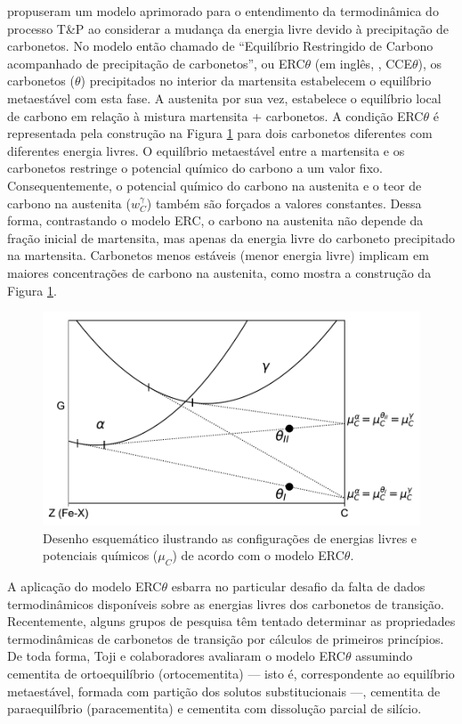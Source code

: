  propuseram um modelo aprimorado para o entendimento da termodinâmica do processo T\&P ao considerar a mudança da energia livre devido à precipitação de carbonetos. No modelo então chamado de ``Equilíbrio Restringido de Carbono acompanhado de precipitação de carbonetos'', ou ERC$\theta$ (em inglês, , CCE$\theta$), os carbonetos ($\theta$) precipitados no interior da martensita estabelecem o equilíbrio metaestável com esta fase. A austenita por sua vez, estabelece o equilíbrio local de carbono em relação à mistura martensita + carbonetos. A condição ERC$\theta$ é representada pela construção na Figura \ref{fig:esquema_ERCtheta} para dois carbonetos diferentes com diferentes energia livres. O equilíbrio metaestável entre a martensita e os carbonetos restringe o potencial químico do carbono a um valor fixo. Consequentemente, o potencial químico do carbono na austenita e o teor de carbono na austenita ($w_C^\gamma$) também são forçados a valores constantes. Dessa forma, contrastando o modelo ERC, o carbono na austenita não depende da fração inicial de martensita, mas apenas da energia livre do carboneto precipitado na martensita. Carbonetos menos estáveis (menor energia livre) implicam em maiores concentrações de carbono na austenita, como mostra a construção da Figura \ref{fig:esquema_ERCtheta}. 

\begin{figure}
  \centering  
  \includegraphics[width=.8\textwidth]{img/common_tangent.pdf}
  \caption{Desenho esquemático ilustrando as configurações de energias livres e potenciais químicos ($\mu_C$) de acordo com o modelo ERC$\theta$.}
  \label{fig:esquema_ERCtheta}
\end{figure}

A aplicação do modelo ERC$\theta$ esbarra no particular desafio da falta de dados termodinâmicos disponíveis sobre as energias livres dos carbonetos de transição. Recentemente, alguns grupos de pesquisa têm tentado determinar as propriedades termodinâmicas de carbonetos de transição por cálculos de primeiros princípios. %
De toda forma, Toji e colaboradores avaliaram o modelo ERC$\theta$ assumindo cementita de ortoequilíbrio (ortocementita) --- isto é, correspondente ao equilíbrio metaestável, formada com partição dos solutos substitucionais ---, cementita de paraequilíbrio (paracementita) e cementita com dissolução parcial de silício.

